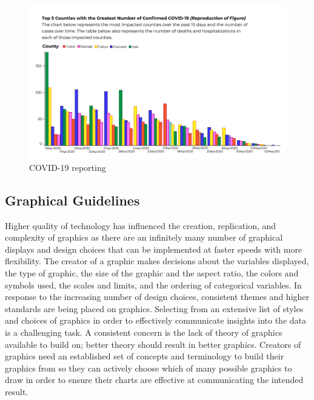 \documentclass[print]{nuthesis}
\begin{document}
\begin{figure}[tbp]

{\centering \includegraphics[width=0.85\linewidth,]{images/covid-ga-recreation} 

}

\caption{COVID-19 reporting}\label{fig:covid-19-reporting}
\end{figure}

\hypertarget{graphical-guidelines}{%
\subsection{Graphical Guidelines}\label{graphical-guidelines}}

Higher quality of technology has influenced the creation, replication, and complexity of graphics as there are an infinitely many number of graphical displays and design choices that can be implemented at faster speeds with more flexibility.
The creator of a graphic makes decisions about the variables displayed, the type of graphic, the size of the graphic and the aspect ratio, the colors and symbols used, the scales and limits, and the ordering of categorical variables.
In response to the increasing number of design choices, consistent themes and higher standards are being placed on graphics.
Selecting from an extensive list of styles and choices of graphics in order to effectively communicate insights into the data is a challenging task.
A consistent concern is the lack of theory of graphics available to build on; better theory should result in better graphics.
Creators of graphics need an established set of concepts and terminology to build their graphics from so they can actively choose which of many possible graphics to draw in order to ensure their charts are effective at communicating the intended result.
\end{document}
